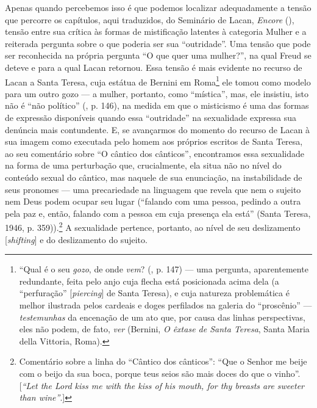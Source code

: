 Apenas quando percebemos isso é que podemos localizar adequadamente a
tensão que percorre os capítulos, aqui traduzidos, do Seminário  de
Lacan, \emph{Encore} (), tensão entre sua crítica às formas de
mistificação latentes à categoria Mulher e a reiterada pergunta sobre o
que poderia ser sua ``outridade''. Uma tensão que pode ser reconhecida
na própria pergunta ``O que quer uma mulher?'', na qual Freud se deteve
e para a qual Lacan retornou. Essa tensão é mais evidente no recurso de
Lacan a Santa Teresa, cuja estátua de Bernini em Roma\footnote{``Qual é
  o seu \emph{gozo}, de onde \emph{vem}? (, p. 147) --- uma
  pergunta, aparentemente redundante, feita pelo anjo cuja flecha está
  posicionada acima dela (a ``perfuração'' {[}\emph{piercing}{]} de
  Santa Teresa), e cuja natureza problemática é melhor ilustrada pelos
  cardeais e doges perfilados na galeria do ``proscênio'' ---
  \emph{testemunhas} da encenação de um ato que, por causa das linhas
  perspectivas, eles não podem, de fato, \emph{ver} (Bernini, \emph{O
  êxtase de Santa Teresa}, Santa Maria della Vittoria, Roma).} ele tomou
como modelo para um outro gozo --- a mulher, portanto, como ``mística'',
mas, ele insistiu, isto não é ``não político'' (, p. 146), na
medida em que o misticismo é uma das formas de expressão disponíveis
quando essa ``outridade'' na sexualidade expressa sua denúncia mais
contundente. E, se avançarmos do momento do recurso de Lacan à sua
imagem como executada pelo homem aos próprios escritos de Santa Teresa,
ao seu comentário sobre ``O cântico dos cânticos'', encontramos essa
sexualidade na forma de uma perturbação que, crucialmente, ela situa não
no nível do conteúdo sexual do cântico, mas naquele de sua enunciação,
na instabilidade de seus pronomes --- uma precariedade na linguagem que
revela que nem o sujeito nem Deus podem ocupar seu lugar (``falando com
uma pessoa, pedindo a outra pela paz e, então, falando com a pessoa em
cuja presença ela está'' (Santa Teresa, 1946, p. 359)).\footnote{Comentário
  sobre a linha do ``Cântico dos cânticos'': ``Que o Senhor me beije com
  o beijo da sua boca, porque teus seios são mais doces do que o
  vinho''. {[}\emph{``Let the Lord kiss me with the kiss of his mouth,
  for thy breasts are sweeter than wine''}.{]}} A sexualidade pertence,
portanto, ao nível de seu deslizamento {[}\emph{shifting}{]} e do
deslizamento do sujeito.

